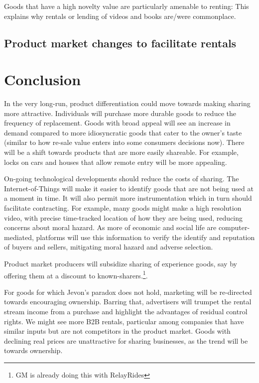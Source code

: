 \documentclass[11pt]{article}
\begin{document}
Goods that have a high novelty value are particularly amenable to renting: 
This explains why rentals or lending of videos and books are/were commonplace.  

\subsection{Product market changes to facilitate rentals} 

\section{Conclusion}
In the very long-run, product differentiation could move towards making sharing more attractive. 
Individuals will purchase more durable goods to reduce the frequency of replacement. 
Goods with broad appeal will see an increase in demand compared to more idiosyncratic goods that cater to the owner's taste (similar to how re-sale value enters into some consumers decisions now). 
There will be a shift towards products that are more easily shareable. 
For example, locks on cars and houses that allow remote entry will be more appealing. 

On-going technological developments should reduce the costs of sharing. 
The Internet-of-Things will make it easier to identify goods that are not being used at a moment in time. 
It will also permit more instrumentation which in turn should facilitate contracting. 
For example, many goods might make a high resolution video, with precise time-tracked location of how they are being used, reducing concerns about moral hazard. 
As more of economic and social life are computer-mediated, platforms will use this information to verify the identify and reputation of buyers and sellers, mitigating moral hazard and adverse selection.  

Product market producers will subsidize sharing of experience goods, say by offering them at a discount to known-sharers.\footnote{GM is already doing this with RelayRides}.  

For goods for which Jevon's paradox does not hold, marketing will be re-directed towards encouraging ownership.
Barring that, advertisers will trumpet the rental stream income from a purchase and highlight the advantages of residual control rights. 
We might see more B2B rentals, particular among companies that have similar inputs but are not competitors in the product market. 
Goods with declining real prices are unattractive for sharing businesses, as the trend will be towards ownership. 
\end{document}
